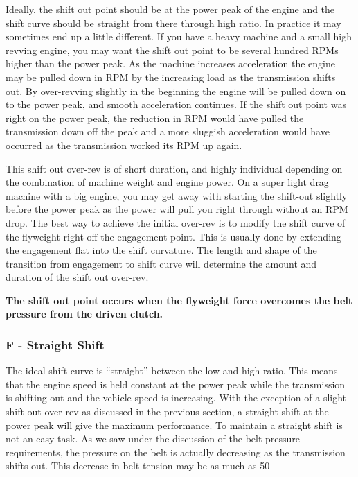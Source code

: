 \documentclass[12pt, titlepage]{article}
\begin{document}
Ideally, the shift out point should be at the power peak of the engine and the shift curve should be straight from there through high ratio. In practice it may sometimes end up a little different. If you have a heavy machine and a small high revving engine, you may want the shift out point to be several hundred RPMs higher than the power peak. As the machine increases acceleration the engine may be pulled down in RPM by the increasing load as the transmission shifts out. By over-revving slightly in the beginning the engine will be pulled down on to the power peak, and smooth acceleration continues. If the shift out point was right on the power peak, the reduction in RPM would have pulled the transmission down off the peak and a more sluggish acceleration would have occurred as the transmission worked its RPM up again.

This shift out over-rev is of short duration, and highly individual depending on the combination of machine weight and engine power. On a super light drag machine with a big engine, you may get away with starting the shift-out slightly before the power peak as the power will pull you right through without an RPM drop. The best way to achieve the initial over-rev is to modify the shift curve of the flyweight right off the engagement point. This is usually done by extending the engagement flat into the shift curvature. The length and shape of the transition from engagement to shift curve will determine the amount and duration of the shift out over-rev.

\textbf{The shift out point occurs when the flyweight force overcomes the belt pressure from the driven clutch.}

\subsubsection*{F - Straight Shift}

The ideal shift-curve is “straight” between the low and high ratio. This means that the engine speed is held constant at the power peak while the transmission is shifting out and the vehicle speed is increasing. With the exception of a slight shift-out over-rev as discussed in the previous section, a straight shift at the power peak will give the maximum performance. To maintain a straight shift is not an easy task. As we saw under the discussion of the belt pressure requirements, the pressure on the belt is actually decreasing as the transmission shifts out. This decrease in belt tension may be as much as 50%
\end{document}
